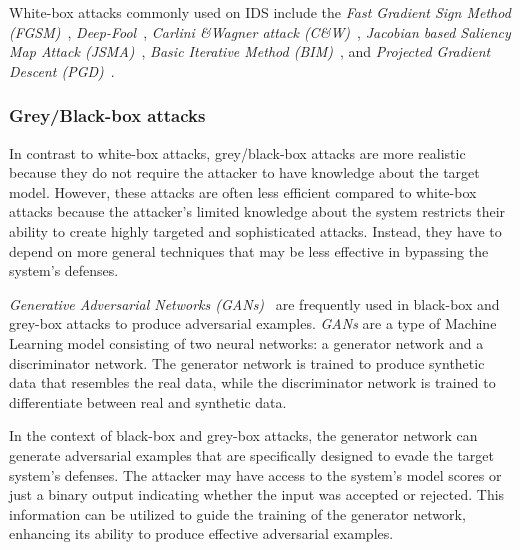 White-box attacks commonly used on IDS include the \textit{Fast Gradient Sign Method (FGSM)}~\cite{fgsm},
\textit{Deep-Fool}~\cite{deepfool}, \textit{Carlini \&Wagner attack (C\&W)}~\cite{carlini},
\textit{Jacobian based Saliency Map Attack (JSMA)}~\cite{jsma},
\textit{Basic Iterative Method (BIM)}~\cite{bim},
and \textit{Projected Gradient Descent (PGD)}~\cite{pgd}.

\subsubsection{Grey/Black-box attacks}\label{subsubsec:grey-box-attacks}

In contrast to white-box attacks, grey/black-box attacks are more realistic because they do not require the attacker to
have knowledge about the target model.
However, these attacks are often less efficient compared to white-box attacks because the attacker's limited knowledge
about the system restricts their ability to create highly targeted and sophisticated attacks.
Instead, they have to depend on more general techniques that may be less effective in bypassing the system's defenses.

\textit{Generative Adversarial Networks (GANs)}~\cite{goodfellow2020generative} are frequently used in black-box and grey-box
attacks to produce adversarial examples.
\textit{GANs} are a type of Machine Learning model consisting of two neural networks: a generator network and a discriminator
network.
The generator network is trained to produce synthetic data that resembles the real data, while the discriminator
network is trained to differentiate between real and synthetic data.

In the context of black-box and grey-box attacks, the generator network can generate adversarial examples that are
specifically designed to evade the target system's defenses.
The attacker may have access to the system's model scores or just a binary output indicating whether the input was
accepted or rejected.
This information can be utilized to guide the training of the generator network, enhancing its ability to produce
effective adversarial examples.

